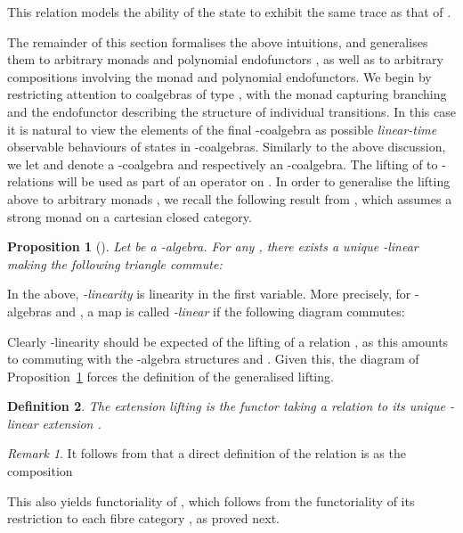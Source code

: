 \documentclass[submission,copyright,creativecommons]{eptcs}
\theoremstyle{plain}\newtheorem{theorem}{Theorem}[section]
\newtheorem{proposition}[theorem]{Proposition}
\newtheorem{definition}[theorem]{Definition}
\theoremstyle{remark}
\newtheorem{remark}{Remark}[section]
\begin{document}
This relation models the ability of the state  to exhibit the same trace as that of .

The remainder of this section formalises the above intuitions, and generalises them to arbitrary monads  and polynomial endofunctors , as well as to arbitrary compositions involving the monad  and polynomial endofunctors. We begin by restricting attention to coalgebras of type , with the monad  capturing branching and the endofunctor  describing the structure of individual transitions. In this case it is natural to view the elements of the final -coalgebra as possible \emph{linear-time} observable behaviours of states in -coalgebras. Similarly to the above discussion, we let  and  denote a -coalgebra and respectively an -coalgebra. The lifting of  to -relations will be used as part of an operator on . In order to generalise the lifting  above to arbitrary monads , we recall the following result from \cite{Kock12}, which assumes a strong monad  on a cartesian closed category.

\begin{proposition}[{\cite[Proposition~4.1]{Kock12}}]
\label{prop-kock}
Let  be a -algebra. For any , there exists a unique -linear  making the following triangle commute:

\end{proposition}
In the above, \emph{-linearity} is linearity in the first variable. More precisely, for -algebras  and , a map  is called \emph{-linear} if the following diagram commutes:

Clearly -linearity should be expected of the lifting  of a relation , as this amounts to  commuting with the -algebra structures  and . Given this, the diagram of Proposition~\ref{prop-kock} forces the definition of the generalised lifting.

\begin{definition}
The \emph{extension lifting}  is the functor taking a relation  to its unique -linear extension .
\end{definition}

\begin{remark}
It follows from \cite{Kock12} that a direct definition of the relation  is as the composition

This also yields functoriality of , which follows from the functoriality of its restriction to each fibre category , as proved next.
\end{remark}
\end{document}

